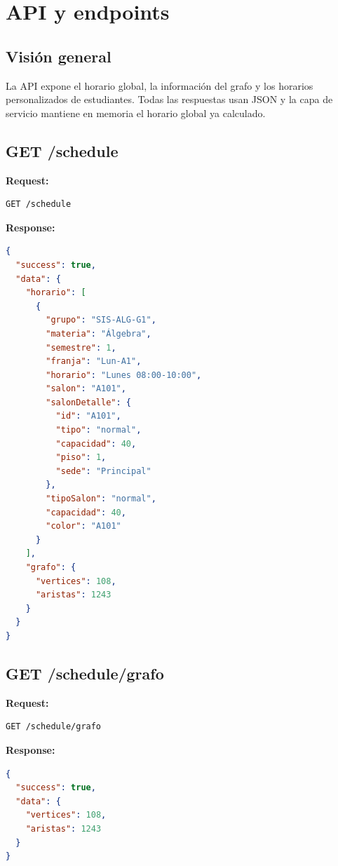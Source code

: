 \chapter{API y endpoints}

\section{Visión general}

La API expone el horario global, la información del grafo y los horarios personalizados de estudiantes. Todas las respuestas usan JSON y la capa de servicio mantiene en memoria el horario global ya calculado.

\section{GET /schedule}

\textbf{Request:}
\begin{lstlisting}[language=Bash]
GET /schedule
\end{lstlisting}

\textbf{Response:}
\begin{lstlisting}[language=JSON,caption={Respuesta de /schedule}]
{
  "success": true,
  "data": {
    "horario": [
      {
        "grupo": "SIS-ALG-G1",
        "materia": "Álgebra",
        "semestre": 1,
        "franja": "Lun-A1",
        "horario": "Lunes 08:00-10:00",
        "salon": "A101",
        "salonDetalle": {
          "id": "A101",
          "tipo": "normal",
          "capacidad": 40,
          "piso": 1,
          "sede": "Principal"
        },
        "tipoSalon": "normal",
        "capacidad": 40,
        "color": "A101"
      }
    ],
    "grafo": {
      "vertices": 108,
      "aristas": 1243
    }
  }
}
\end{lstlisting}

\section{GET /schedule/grafo}

\textbf{Request:}
\begin{lstlisting}[language=Bash]
GET /schedule/grafo
\end{lstlisting}

\textbf{Response:}
\begin{lstlisting}[language=JSON,caption={Respuesta de /schedule/grafo}]
{
  "success": true,
  "data": {
    "vertices": 108,
    "aristas": 1243
  }
}
\end{lstlisting}

